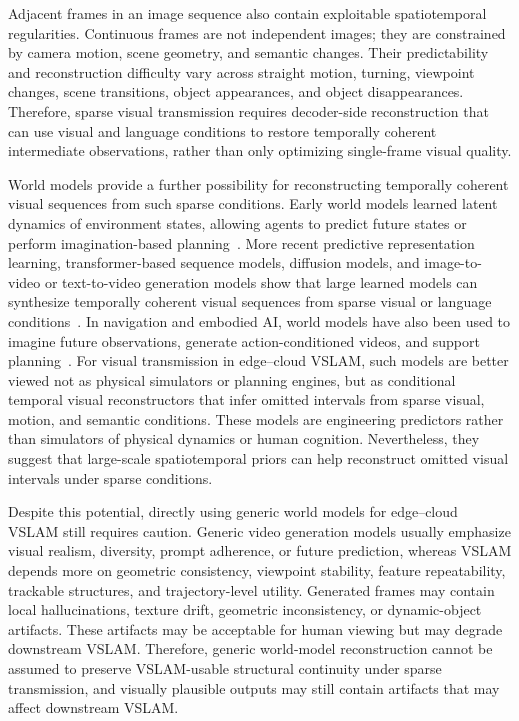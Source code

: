\documentclass[journal]{IEEEtran}
\begin{document}
Adjacent frames in an image sequence also contain exploitable spatiotemporal regularities. Continuous frames are not independent images; they are constrained by camera motion, scene geometry, and semantic changes. Their predictability and reconstruction difficulty vary across straight motion, turning, viewpoint changes, scene transitions, object appearances, and object disappearances. Therefore, sparse visual transmission requires decoder-side reconstruction that can use visual and language conditions to restore temporally coherent intermediate observations, rather than only optimizing single-frame visual quality.

World models provide a further possibility for reconstructing temporally coherent visual sequences from such sparse conditions. Early world models learned latent dynamics of environment states, allowing agents to predict future states or perform imagination-based planning~\cite{ha2018worldmodels,hafner2019planet,hafner2020dreamer,hafner2023dreamerv3}. More recent predictive representation learning, transformer-based sequence models, diffusion models, and image-to-video or text-to-video generation models show that large learned models can synthesize temporally coherent visual sequences from sparse visual or language conditions~\cite{lecun2022path,assran2024vjepa,blattmann2023svd,ho2022videodiffusion,villegas2022phenaki}. In navigation and embodied AI, world models have also been used to imagine future observations, generate action-conditioned videos, and support planning~\cite{yang2024unisim,du2023learning,wu2023daydreamer,wang2025targetbench,bar2025navigation}. For visual transmission in edge--cloud VSLAM, such models are better viewed not as physical simulators or planning engines, but as conditional temporal visual reconstructors that infer omitted intervals from sparse visual, motion, and semantic conditions. These models are engineering predictors rather than simulators of physical dynamics or human cognition. Nevertheless, they suggest that large-scale spatiotemporal priors can help reconstruct omitted visual intervals under sparse conditions.

Despite this potential, directly using generic world models for edge--cloud VSLAM still requires caution. Generic video generation models usually emphasize visual realism, diversity, prompt adherence, or future prediction, whereas VSLAM depends more on geometric consistency, viewpoint stability, feature repeatability, trackable structures, and trajectory-level utility. Generated frames may contain local hallucinations, texture drift, geometric inconsistency, or dynamic-object artifacts. These artifacts may be acceptable for human viewing but may degrade downstream VSLAM. Therefore, generic world-model reconstruction cannot be assumed to preserve VSLAM-usable structural continuity under sparse transmission, and visually plausible outputs may still contain artifacts that may affect downstream VSLAM.
\end{document}
